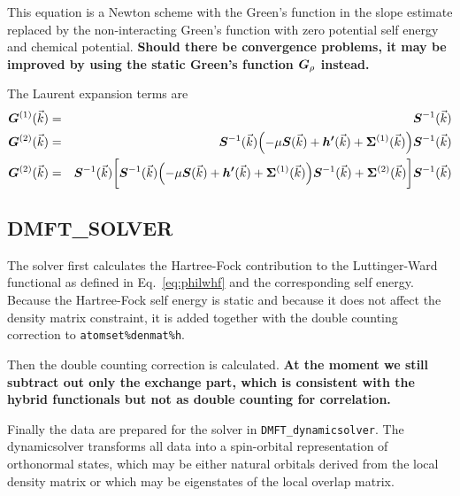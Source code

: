 \documentclass[11pt,a4paper]{report}
\begin{document}
This equation is a Newton scheme with the Green's function in the
slope estimate replaced by the non-interacting Green's function with
zero potential self energy and chemical potential. \textbf{Should
  there be convergence problems, it may be improved by using the
  static Green's function $\bm{G}_\rho$ instead.}



The Laurent expansion terms are
\begin{eqnarray}
\bm{G}^{(1)}(\vec{k})&=&\bm{S}^{-1}(\vec{k})
\nonumber\\
\bm{G}^{(2)}(\vec{k})&=&\bm{S}^{-1}(\vec{k})
\Bigl(-\mu\bm{S}(\vec{k})+\bm{h'}(\vec{k})+\bm{\Sigma}^{(1)}(\vec{k})
\Bigr)
\bm{S}^{-1}(\vec{k})
\nonumber\\
\bm{G}^{(2)}(\vec{k})&=&
\bm{S}^{-1}(\vec{k})
\biggl[
\bm{S}^{-1}(\vec{k})
\Bigl(-\mu\bm{S}(\vec{k})+\bm{h'}(\vec{k})+\bm{\Sigma}^{(1)}(\vec{k})
\Bigr)
\bm{S}^{-1}(\vec{k})+\bm{\Sigma}^{(2)}(\vec{k})
\biggr]
\bm{S}^{-1}(\vec{k})
\nonumber\\
\end{eqnarray}


\subsection{DMFT\_SOLVER}
The solver first calculates the Hartree-Fock contribution to the
Luttinger-Ward functional as defined in Eq.~\ref{eq:philwhf} and the
corresponding self energy. Because the Hartree-Fock self energy is
static and because it does not affect the density matrix constraint,
it is added together with the double counting correction to
\verb|atomset%denmat%h|.


Then the double counting correction is calculated. \textbf{At the
  moment we still subtract out only the exchange part, which is
  consistent with the hybrid functionals but not as double counting
  for correlation.}

Finally the data are prepared for the solver in
\verb|DMFT_dynamicsolver|. The dynamicsolver transforms all data into
a spin-orbital representation of orthonormal states, which may be
either natural orbitals derived from the local density matrix or which
may be eigenstates of the local overlap matrix.

\end{document}
